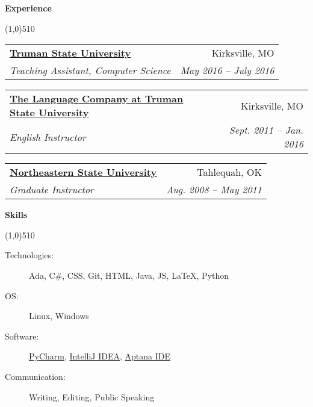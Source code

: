 \documentclass[letterpaper,11pt]{article}
\makeatletter
\newcommand{\resheading}[1]{{\large {\begin{minipage}{\textwidth}{\textbf{#1 \vphantom{p\^{E}}}}\end{minipage}}}}
\newcommand{\ressubheading}[4]{
\begin{tabular*}{6.5in}{l@{\extracolsep{\fill}}r}
		\textbf{#1} & #2 \\
		\textit{#3} & \textit{#4} \\
\end{tabular*}\vspace{-6pt}}
\makeatother
\begin{document}




\resheading{Experience}

\line(1,0){510}
	\begin{description}
	
			\item 
			\ressubheading{\href{http://www.truman.edu}{Truman State University }}{Kirksville, MO}
				{Teaching Assistant, Computer Science}{ \footnotesize{May 2016 -- July 2016}}


		\item 
			\ressubheading{\href{http://www.thelanguagecompany.com}{The Language Company at Truman State University}}{Kirksville, MO}
				{English Instructor}{ \footnotesize{Sept. 2011 -- Jan. 2016}}

		\item
			\ressubheading{\href{http://www.nsuok.edu}{Northeastern State University}}{Tahlequah, OK}
				{Graduate Instructor}{ \footnotesize{Aug. 2008 -- May 2011}}


	\end{description}  %



\resheading{Skills}

\line(1,0){510}

	\begin{description}
		\item  [Technologies:] { \footnotesize 
			Ada, C\#, CSS, Git, HTML, Java, JS, \LaTeX, Python
		}
		\item[OS:] { \footnotesize
			Linux, Windows
		}
		
		\item[Software:]{\footnotesize \href{http://www.jetbrains.com/pycharm/}{PyCharm},
		\href{http://www.jetbrains.com/idea/}{IntelliJ IDEA},
		\href{http://www.aptana.com/}{Aptana IDE}

} 
		\item[Communication:] { \footnotesize
			Writing, Editing, Public Speaking
		}

	\end{description} %
\end{document}
